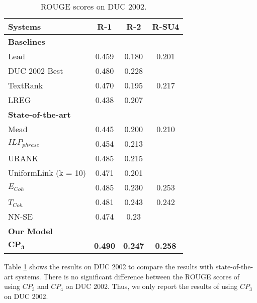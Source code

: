 \begin{table}[!ht]
\centering
\small
\begin{tabular}{@{}l|c|c|c@{}}
Systems & R-1 & R-2 & R-SU4\\\hline
\textbf{Baselines}  & & &\\
Lead & 0.459 & 0.180 & 0.201\\
DUC 2002 Best & 0.480 & 0.228 & \\
TextRank & 0.470 & 0.195 & 0.217\\
LREG & 0.438 & 0.207 & \\\hline
\textbf{State-of-the-art}  & & &\\
Mead & 0.445 & 0.200 & 0.210\\
$ILP_{phrase}$ & 0.454 & 0.213 & \\
URANK & 0.485 & 0.215 & \\
UniformLink (k = 10) & 0.471 & 0.201 & \\
$E_{Coh}$ & 0.485 & 0.230 & 0.253 \\
$T_{Coh}$\ & 0.481 & 0.243 & 0.242 \\
NN-SE & 0.474 & 0.23 & \\\hline
\textbf{Our Model} & & & \\
$\mathbf{CP_3}$ & \textbf{0.490} & \textbf{0.247} & \textbf{0.258}\\
\hline
\end{tabular}
\caption{ROUGE scores on DUC 2002.}
\label{tab:duc2002_res}
\end{table}


Table \ref{tab:duc2002_res} shows the results on DUC 2002 to compare the results with state-of-the-art systems. There is no significant difference between the ROUGE scores of using $CP_3$ and $CP_4$ on DUC 2002. Thus, we only report the results of using $CP_3$ on DUC 2002.

